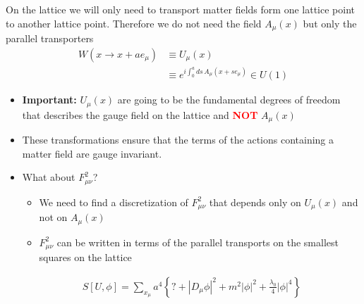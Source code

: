 \documentclass[10pt,a4paper]{article}
\theoremstyle{definition}
\begin{document}
On the lattice we will only need to transport matter fields form one lattice point to another lattice point. Therefore we do not need the field $A_\mu(x)$ but only the parallel transporters
\begin{align}
W(x\rightarrow x+ae_\mu)
&\equiv U_\mu(x)\\
&\equiv e^{i\int_0^a ds\,A_\mu(x+se_\mu)}\in U(1)
\end{align}
\begin{itemize}
\item {\bf Important: } $U_\mu(x)$ are going to be the fundamental degrees of freedom that describes the gauge field on the lattice and \textcolor{red}{\bf NOT} $A_\mu(x)$
\item These transformations ensure that the terms of the actions containing a matter field are gauge invariant. 
\item What about $F_{\mu\nu}^2$?
\begin{itemize}
\item We need to find a discretization of $F_{\mu\nu}^2$ that depends only on $U_\mu(x)$ and not on $A_\mu(x)$
\item $F_{\mu\nu}^2$ can be written in terms of the parallel transports on the smallest squares on the lattice
\begin{center}
\begin{figure}[!h]
\centering
{}
\end{figure}
\end{center}

\end{itemize}
\begin{align}
S[U,\phi]=\sum_{x_\mu}a^4\left\{?+|D_\mu\phi|^2+m^2|\phi|^2+\frac{\lambda_0}{4}|\phi|^4\right\}
\end{align}




\end{itemize}
\end{document}
